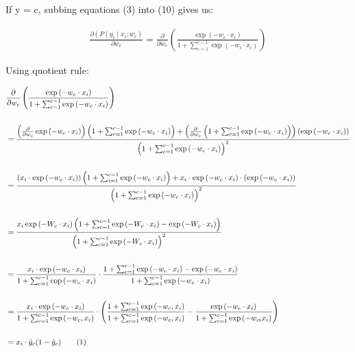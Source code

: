 \documentclass{article}
\newcommand\numberthis{\addtocounter{equation}{1}\tag{\theequation}}
\begin{document}
If y = c, subbing equations (3) into (10) gives us:

$$
\begin{aligned}
    \frac{\partial\left(P\left(y_i \mid x_i ; w_c\right)\right.}{\partial w_c} = \frac{\partial}{\partial w_c}\left(\frac{\exp \left(-w_c \cdot x_i \right)}{1+\sum_{c=1}^{c-1} \exp \left(-w_c \cdot x_i \right)}\right)
\end{aligned}
$$

Using quotient rule:


\begin{align*}
    & \frac{\partial}{\partial w_c}\left(\frac{\exp \left(-w_c \cdot x_i \right)}{1+\sum_{c=1}^{c-1} \exp \left(-w_c \cdot x_i \right)}\right) \\
    \\
    & =\frac{\left(\frac{\partial}{\partial w_c} \exp \left(-w_c \cdot x_i\right)\right)\left(1+\sum_{c=1}^{c-1} \exp \left(-w_c \cdot x_i\right)\right)+\left(\frac{\partial}{\partial w_c}\left(1+\sum_{c=1}^{c-1} \exp \left(-w_c \cdot x_i\right)\right)\right)\left(\exp \left(-w_c \cdot x_i\right)\right)}{\left(1+\sum_{c=1}^{c-1} \exp \left(-w_c \cdot x_i\right)\right)^2} \\
    \\
    & =\frac{\left(x_i \cdot \exp \left(-w_c \cdot x_i\right)\right)\left(1+\sum_{i=1}^{c-1} \exp \left(-w_c \cdot x_i\right)\right)+x_i \cdot \exp \left(-w_c \cdot x_i\right) \cdot\left(\exp \left(-w_c \cdot x_i\right)\right)}{\left(1+\sum_{c=1}^{c-1} \exp \left(-w_c \cdot x_i\right)\right)^2} \\ 
    \\
    & =\frac{x_i \exp \left(-W_c \cdot x_i\right)\left(1+\sum_{c=1}^{c-1} \exp \left(-W_c \cdot x_i\right)-\exp \left(-W_c \cdot x_i\right)\right)}{\left(1+\sum_{c=1}^{c-1} \exp \left(-W_c \cdot x_i\right)\right)^2} \\
    \\
    & =\frac{x_i \cdot \exp \left(-w_c \cdot x_i\right)}{1+\sum_{c=1}^{c-1} \operatorname{cop}\left(-w_c \cdot x_i\right)} \cdot \frac{1+\sum_{c=1}^{c-1} \exp \left(-w_c \cdot x_i\right)-\exp \left(-w_c \cdot x_i\right)}{1+\sum_{c=1}^{c-1} \exp \left(-w_c \cdot x_i\right)} \\
    \\
    & =\frac{x_i \cdot \exp \left(-w_c \cdot x_i\right)}{1+\sum_{c=1}^{c-1} \exp \left(-w_c, x_i\right)} \cdot\left(\frac{1+\sum_{c=1}^{c-1} \exp \left(-w_c, x_i\right)}{1+\sum_{c=1}^{c-1} \exp \left(-w_c, x_i\right)}-\frac{\exp \left(-w_c \cdot x_i\right)}{1+\sum_{c=1}^{c-1} \exp \left(-w_{c i} x_i\right)}\right) \\
    \\
    & =x_i \cdot \hat{y}_c(1-\hat{y}_c) \numberthis \label{eqn}
\end{align*}
\end{document}
